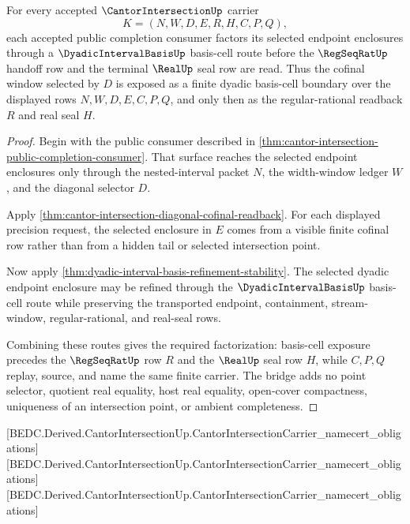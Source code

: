 \begin{theorem}
\label{thm:cantor-intersection-dyadic-interval-basis-bridge}
For every accepted $\CantorIntersectionUp$ carrier
$$
K=(N,W,D,E,R,H,C,P,Q),
$$
each accepted public completion consumer factors its selected endpoint enclosures through a $\DyadicIntervalBasisUp$ basis-cell route before the $\RegSeqRatUp$ handoff row and the terminal $\RealUp$ seal row are read. Thus the cofinal window selected by $D$ is exposed as a finite dyadic basis-cell boundary over the displayed rows $N,W,D,E,C,P,Q$, and only then as the regular-rational readback $R$ and real seal $H$.
\end{theorem}
\begin{proof}
Begin with the public consumer described in \autoref{thm:cantor-intersection-public-completion-consumer}. That surface reaches the selected endpoint enclosures only through the nested-interval packet $N$, the width-window ledger $W$, and the diagonal selector $D$.

Apply \autoref{thm:cantor-intersection-diagonal-cofinal-readback}. For each displayed precision request, the selected enclosure in $E$ comes from a visible finite cofinal row rather than from a hidden tail or selected intersection point.

Now apply \autoref{thm:dyadic-interval-basis-refinement-stability}. The selected dyadic endpoint enclosure may be refined through the $\DyadicIntervalBasisUp$ basis-cell route while preserving the transported endpoint, containment, stream-window, regular-rational, and real-seal rows.

Combining these routes gives the required factorization: basis-cell exposure precedes the $\RegSeqRatUp$ row $R$ and the $\RealUp$ seal row $H$, while $C,P,Q$ replay, source, and name the same finite carrier. The bridge adds no point selector, quotient real equality, host real equality, open-cover compactness, uniqueness of an intersection point, or ambient completeness.
\end{proof}

[BEDC.Derived.CantorIntersectionUp.CantorIntersectionCarrier\_namecert\_obligations]
[BEDC.Derived.CantorIntersectionUp.CantorIntersectionCarrier\_namecert\_obligations]
[BEDC.Derived.CantorIntersectionUp.CantorIntersectionCarrier\_namecert\_obligations]


